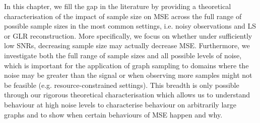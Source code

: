 In this chapter, we fill the gap in the literature by providing a theoretical characterisation of the impact of sample size on  MSE  across the full range of possible sample sizes in the most common settings, i.e. noisy observations and LS or GLR reconstruction. More specifically, we focus on whether under sufficiently low SNRs, decreasing sample size may actually decrease MSE. Furthermore, we investigate both the full range of sample sizes and all possible levels of noise, which is important for the application of graph sampling to domains where the noise may be greater than the signal  or when observing more samples might not be feasible (e.g. resource-constrained settings). This breadth is only possible through our rigorous theoretical characterisation which allows us to understand behaviour at high noise levels\bs{,} to characterise behaviour on arbitrarily large graphs\bs{,} and to show when certain behaviours of MSE happen and why. %

